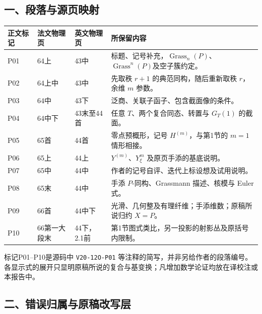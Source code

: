 \documentclass[UTF8,a4paper]{ctexbook}
\begin{document}
\subsection*{一、段落与源页映射}

\begin{longtable}{@{}p{.12\linewidth}p{.16\linewidth}p{.16\linewidth}p{.44\linewidth}@{}}
\toprule
正文标记 & 法文物理页 & 英文物理页 & 所保留内容\\
\midrule
\endhead
P01 & 64上 & 43中 & 标题、记号补充，$\operatorname{Grass}_n(P)$、$\operatorname{Grass}^n(P)$及空子簇约定。\\
P02 & 64上中 & 43中 & 先取秩 $r+1$ 的典范同构，随后重新取秩 $r$，余维 $m$ 参数。\\
P03 & 64中 & 43下 & 泛商、关联子函子、包含截面像的条件。\\
P04 & 64中下 & 43末至44首 & 任意 $T$、两个复合同态、转置与 $G_T(1)$ 的截面。\\
P05 & 65首 & 44首 & 零点预概形，记号 $H^{(m)}$，与第1节的 $m=1$ 情形相接。\\
P06 & 65上 & 44上 & $Y^{(m)}$、$Y^m_\xi$ 及原页手添的基底说明。\\
P07 & 65中 & 44中 & 作者的记号自评、迭代上标设想及试用说明。\\
P08 & 65末 & 44中 & 手添 $P$-同构、Grassmann 描述、核模与 Euler 式。\\
P09 & 66首 & 44中下 & 光滑、几何整及有理纤维；手添维数；原稿所说归约 $X=P$。\\
P10 & 66第一大段末 & 44下，2.1前 & 第1节图式类比，另一投影的射影丛及原括号内限制。\\
\bottomrule
\end{longtable}

标记P01--P10是源码中 \texttt{V20-12O-P01} 等注释的简写，并非另给作者的段落编号。各显示式的展开只显明原稿所说的复合与基变换；凡增加数学论证均放在译校注或本报告中。

\subsection*{二、错误归属与原稿改写层}
\end{document}
